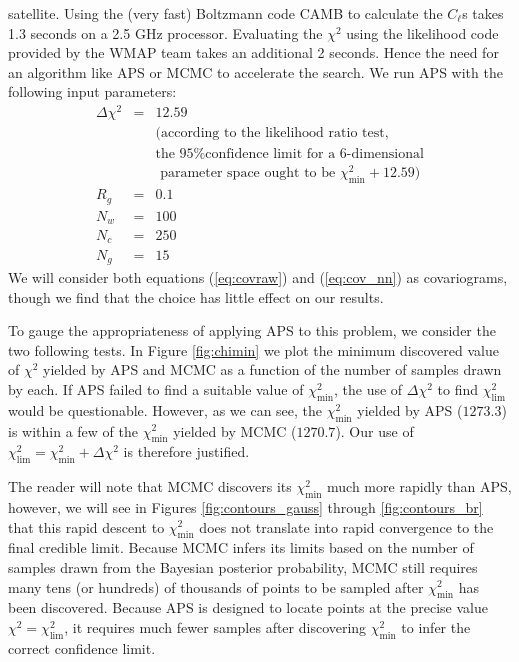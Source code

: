 \documentclass[useAMS,usenatbib]{aastex}
\begin{document}
satellite.  Using the (very fast) Boltzmann code CAMB to calculate the $C_\ell$s
\cite{camb} takes 1.3 seconds on a 2.5 GHz processor.  
Evaluating the $\chi^2$ using the likelihood code provided by the WMAP team
\cite{wmap7likelihood} takes an additional 2 seconds.  Hence the need
for an algorithm like APS or MCMC to accelerate the search.
We run APS with the following input parameters:
\begin{eqnarray}
\Delta\chi^2&=&12.59 \nonumber\\
&&\text{(according to the likelihood ratio test,}\nonumber\\
&&\text{the
95\% confidence limit for a 6-dimensional}\nonumber\\
&&\text{ parameter space
ought to be }\chi^2_\text{min}+12.59\text{)}\nonumber\\
R_g&=&0.1\nonumber\\
N_w&=&100\nonumber\\
N_c&=&250\nonumber\\
N_g&=&15\nonumber
\end{eqnarray}
We will consider both equations (\ref{eq:covraw}) and (\ref{eq:cov_nn})
as covariograms, though we find that the choice has little effect on our
results.

To gauge the appropriateness of applying APS to this problem, we consider
the two following tests.  In Figure \ref{fig:chimin} we plot the minimum discovered value
of $\chi^2$ yielded by APS and MCMC as a function of the number of samples drawn
by each.  If APS failed to find a suitable value of $\chi^2_\text{min}$, the use of
$\Delta\chi^2$  to find $\chi^2_\text{lim}$ would be questionable.  However, as we can see,
the $\chi^2_\text{min}$ yielded by APS ($1273.3$) 
is within a few of the $\chi^2_\text{min}$ yielded
by MCMC ($1270.7$).  Our use of $\chi^2_\text{lim}=\chi^2_\text{min}+\Delta\chi^2$ is therefore
justified.

The reader will note that
MCMC discovers its $\chi^2_\text{min}$ much more rapidly than APS, however, 
we will see
in Figures \ref{fig:contours_gauss} through \ref{fig:contours_br} that this rapid
descent to $\chi^2_\text{min}$ does not translate into rapid convergence to
the final credible limit.  Because MCMC infers its limits based on the number
of samples drawn from the Bayesian posterior probability, MCMC still requires
many tens (or hundreds) of thousands of points to be sampled after $\chi^2_\text{min}$
has been discovered.  Because APS is designed to locate points at the precise value
$\chi^2=\chi^2_\text{lim}$, it requires much fewer samples after discovering 
$\chi^2_\text{min}$ to infer the correct confidence limit.
\end{document}
